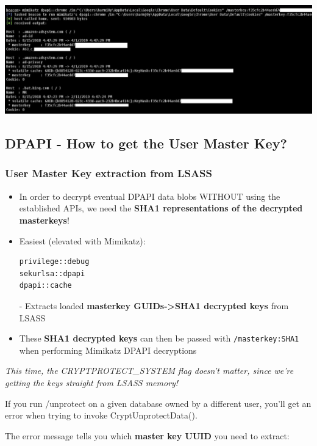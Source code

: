 \begin{center}
    \includegraphics[width=\textwidth]{resources/11-dpapi-user-secret-decryption-using-extracted-user-master-key.png}
\end{center}

\subsection{DPAPI - How to get the User Master Key?}

\subsubsection*{User Master Key extraction from LSASS}

\begin{itemize}
   \item In order to decrypt eventual DPAPI data blobs WITHOUT using the established APIs, we need the \textbf{SHA1 representations of the decrypted masterkeys}!
   
   \item Easiest (elevated with Mimikatz):
   \begin{verbatim}
privilege::debug
sekurlsa::dpapi
dpapi::cache    \end{verbatim} - Extracts loaded \textbf{masterkey GUIDs->SHA1 decrypted keys} from LSASS
   
   \item These \textbf{SHA1 decrypted keys} can then be passed with \texttt{/masterkey:SHA1} when performing Mimikatz DPAPI decryptions
\end{itemize}

\textit{This time, the CRYPTPROTECT\_SYSTEM flag doesn't matter, since we're getting the keys straight from LSASS memory!}

If you run /unprotect on a given database owned by a different user, you'll get an error when trying to invoke CryptUnprotectData().

The error message tells you which \textbf{master key UUID} you need to extract:

